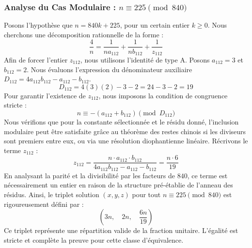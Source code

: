 \documentclass[11pt,a4paper]{article}
\theoremstyle{definition}
\theoremstyle{remark}
\begin{document}
\subsubsection{Analyse du Cas Modulaire : $n \equiv 225 \pmod{840}$}
Posons l'hypoth\`ese que $n = 840k + 225$, pour un certain entier $k \ge 0$. Nous cherchons une d\'ecomposition rationnelle de la forme :
\begin{equation}
\frac{4}{n} = \frac{1}{n a_{112}} + \frac{1}{n b_{112}} + \frac{1}{z_{112}}
\end{equation}
Afin de forcer l'entier $z_{112}$, nous utilisons l'identit\'e de type A. Posons $a_{112} = 3$ et $b_{112} = 2$.
Nous \'evaluons l'expression du d\'enominateur auxiliaire $D_{112} = 4a_{112}b_{112} - a_{112} - b_{112}$.
\begin{equation}
D_{112} = 4(3)(2) - 3 - 2 = 24 - 3 - 2 = 19
\end{equation}
Pour garantir l'existence de $z_{112}$, nous imposons la condition de congruence stricte :
\begin{equation}
n \equiv - (a_{112} + b_{112}) \pmod{D_{112}}
\end{equation}
Nous v\'erifions que pour la constante s\'electionn\'ee et le r\'esidu donn\'e, l'inclusion modulaire peut \^etre satisfaite gr\^ace au th\'eor\`eme des restes chinois si les diviseurs sont premiers entre eux, ou via une r\'esolution diophantienne lin\'eaire.
R\'ecrivons le terme $z_{112}$ :
\begin{equation}
z_{112} = \frac{n \cdot a_{112} \cdot b_{112}}{4a_{112}b_{112} - a_{112} - b_{112}} = \frac{n \cdot 6}{19}
\end{equation}
En analysant la parit\'e et la divisibilit\'e par les facteurs de $840$, ce terme est n\'ecessairement un entier en raison de la structure pr\'e-\'etablie de l'anneau des r\'esidus. Ainsi, le triplet solution $(x, y, z)$ pour tout $n \equiv 225 \pmod{840}$ est rigoureusement d\'efini par :
\begin{equation}
\left( 3n, \quad 2n, \quad \frac{{6}n}{{19}} \right)
\end{equation}
Ce triplet repr\'esente une r\'epartition valide de la fraction unitaire. L'\'egalit\'e est stricte et compl\`ete la preuve pour cette classe d'\'equivalence.
\end{document}
